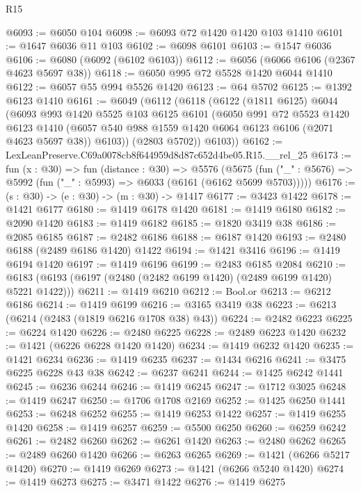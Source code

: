 \begin{lexlean}{R15}
\begin{coremodule}
@6093 := @6050 @104
@6098 := @6093 @72 @1420 @1420 @103 @1410
@6101 := @1647 @6036 @11 @103
@6102 := @6098 @6101
@6103 := @1547 @6036
@6106 := @6080 (@6092 (@6102 @6103))
@6112 := @6056 (@6066 @6106 (@2367 @4623 @5697 @38))
@6118 := @6050 @995 @72 @5528 @1420 @6044 @1410
@6122 := @6057 @55 @994 @5526 @1420
@6123 := @64 @5702
@6125 := @1392 @6123 @1410
@6161 := @6049
    (@6112
      (@6118
        (@6122
          (@1811 @6125)
          @6044
          (@6093
            @993
            @1420
            @5525
            @103
            @6125
            @6101
            (@6050
              @991
              @72
              @5523
              @1420
              @6123
              @1410
              (@6057 @540 @988 @1559 @1420 @6064 @6123 @6106 (@2071 @4623 @5697 @38))
              @6103))
          (@2803 @5702))
        @6103))
@6162 := LexLeanPreserve.C69a0078cb8f644959d8d87c652d4be05.R15.__rel_25
@6173 := fun (x : @30) =>
  fun (distance : @30) =>
  @5576
    (@5675 (fun ("_" : @5676) => @5992 (fun ("_" : @5993) => @6033 (@6161 (@6162 @5699 @5703)))))
@6176 := (s : @30) -> (e : @30) -> (m : @30) -> @1417
@6177 := @3423 @1422
@6178 := @1421 @6177
@6180 := @1419 @6178 @1420
@6181 := @1419 @6180
@6182 := @2090 @1420
@6183 := @1419 @6182
@6185 := @1820 @3419 @38
@6186 := @2085 @6185
@6187 := @2482 @6186
@6188 := @6187 @1420
@6193 := @2480 @6188 (@2489 @6186 @1420) @1422
@6194 := @1421 @3416
@6196 := @1419 @6194 @1420
@6197 := @1419 @6196
@6199 := @2483 @6185 @2084
@6210 := @6183 (@6193 (@6197 (@2480 (@2482 @6199 @1420) (@2489 @6199 @1420) @5221 @1422)))
@6211 := @1419 @6210
@6212 := Bool.or
@6213 := @6212 @6186
@6214 := @1419 @6199
@6216 := @3165 @3419 @38
@6223 := @6213 (@6214 (@2483 (@1819 @6216 @1708 @38) @43))
@6224 := @2482 @6223
@6225 := @6224 @1420
@6226 := @2480 @6225
@6228 := @2489 @6223 @1420
@6232 := @1421 (@6226 @6228 @1420 @1420)
@6234 := @1419 @6232 @1420
@6235 := @1421 @6234
@6236 := @1419 @6235
@6237 := @1434 @6216
@6241 := @3475 @6225 @6228 @43 @38
@6242 := @6237 @6241
@6244 := @1425 @6242 @1441
@6245 := @6236 @6244
@6246 := @1419 @6245
@6247 := @1712 @3025
@6248 := @1419 @6247
@6250 := @1706 @1708 @2169
@6252 := @1425 @6250 @1441
@6253 := @6248 @6252
@6255 := @1419 @6253 @1422
@6257 := @1419 @6255 @1420
@6258 := @1419 @6257
@6259 := @5500 @6250
@6260 := @6259 @6242
@6261 := @2482 @6260
@6262 := @6261 @1420
@6263 := @2480 @6262
@6265 := @2489 @6260 @1420
@6266 := @6263 @6265
@6269 := @1421 (@6266 @5217 @1420)
@6270 := @1419 @6269
@6273 := @1421 (@6266 @5240 @1420)
@6274 := @1419 @6273
@6275 := @3471 @1422
@6276 := @1419 @6275

\end{coremodule}
\end{lexlean}
